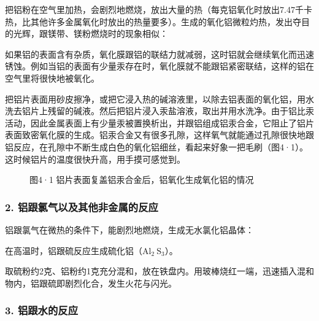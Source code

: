 把铝粉在空气里加热，会剧烈地燃烧，放出大量的热（每克铝氧化时放出7.47千卡热，比其他许多金属氧化时放出的热量要多）。生成的氧化铝微粒灼热，发出夺目的光辉，跟镁带、镁粉燃烧时的现象相似：

如果铝的表面含有杂质，氧化膜跟铝的联结力就减弱，这时铝就会继续氧化而迅速锈蚀。例如当铝的表面有少量汞存在时，氧化膜就不能跟铝紧密联结，这样的铝在空气里将很快地被氧化。

把铝片表面用砂皮擦净，或把它浸入热的碱溶液里，以除去铝表面的氧化铝，用水洗去铝片上残留的碱液。然后把铝片浸入汞盐溶液，取出并用水洗净。由于铝比汞活动，因此金属表面上有少量汞被置换析出，并跟铝组成铝汞合金，它阻止了铝片表面致密氧化膜的生成。铝汞合金又有很多孔隙，这样氧气就能通过孔隙很快地跟铝反应，在孔隙中不断生成白色的氧化铝细丝，看起来好象一把毛刷（图4·1）。这时候铝片的温度很快升高，用手摸可感觉到。

\begin{figure}
\centering
{}
\caption{图4·1 铝片表面复盖铝汞合金后，铝氧化生成氧化铝的情况}
\end{figure}

\subsubsection{2. 铝跟氯气以及其他非金属的反应}

铝跟氯气在微热的条件下，能剧烈地燃烧，生成无水氯化铝晶体：

在高温时，铝跟硫反应生成硫化铝（\(\mathrm{Al}_{2} \mathrm{~S}_{3}\)）。

取硫粉约2克、铝粉约1克充分混和，放在铁盘内。用玻棒烧红一端，迅速插入混和物内，铝跟硫即剧烈化合，发生火花与闪光。

\subsubsection{3. 铝跟水的反应}

